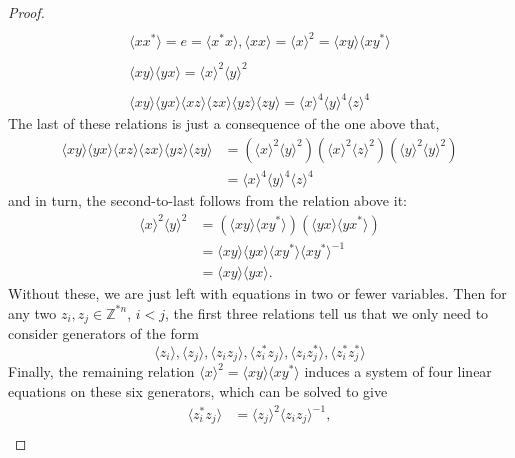 \documentclass{amsbook} %
\numberwithin{section}{chapter}
\begin{document}
\begin{proof}
\[\begin{array}{c}
    	\\
    	\langle xx^* \rangle  =  e  =  \langle x^*x \rangle,    \langle xx \rangle  =  \langle x \rangle^2   =  \langle xy \rangle \langle xy^* \rangle \\
    	\\
    	\langle xy \rangle \langle yx \rangle  =  \langle x \rangle^2 \langle y \rangle^2 \\
    	\\
    	\langle xy \rangle \langle yx \rangle \langle xz \rangle \langle zx \rangle \langle yz \rangle \langle zy \rangle  =  \langle x \rangle^4 \langle y \rangle^4 \langle z \rangle^4 
    \end{array}
  \]
The last of these relations is just a consequence of the one above that,
  \begin{align*}
    \langle xy \rangle \langle yx \rangle \langle xz \rangle \langle zx \rangle \langle yz \rangle \langle zy \rangle &=\left(\langle x \rangle^2 \langle y \rangle^2\right)\left(\langle x \rangle^2 \langle z \rangle^2\right)\left(\langle y \rangle^2 \langle y \rangle^2\right) \\
      &= \langle x \rangle^4 \langle y \rangle^4 \langle z \rangle^4
  \end{align*}
and in turn, the second-to-last follows from the relation above it:
  \begin{align*}
      \langle x \rangle^2 \langle y \rangle^2  &= \left(\langle xy \rangle \langle xy^* \rangle\right)\left(\langle yx \rangle \langle yx^* \rangle\right) \\
      &= \langle xy \rangle \langle yx \rangle \langle xy^* \rangle  \langle xy^* \rangle^{-1} \\
      &= \langle xy \rangle \langle yx \rangle.
  \end{align*}
Without these, we are just left with equations in two or fewer variables. Then for any two $z_i, z_j \in \mathbb{Z}^{\ast n}$, $i<j$, the first three relations tell us that we only need to consider generators of the form
  \[
    \langle z_i \rangle,  \langle z_j \rangle,  \langle z_i z_j \rangle,  \langle z_i^* z_j\rangle,  \langle z_i z_j^* \rangle,  \langle z_i^* z_j^* \rangle
  \]
Finally, the remaining relation $\langle x \rangle^2  =  \langle xy \rangle \langle xy^* \rangle$ induces a system of four linear equations on these six generators, which can be solved to give
  \begin{align*}
			\langle z_i^* z_j \rangle &= \langle z_j \rangle^2 \langle z_i z_j \rangle^{-1}, \\

\end{align*}
\end{proof}
\end{document}

